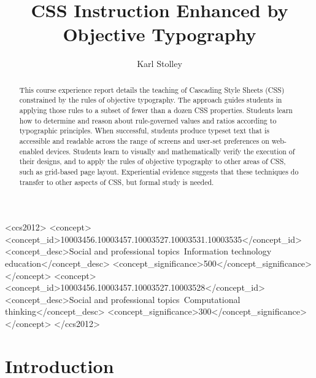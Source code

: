 \documentclass[sigplan,screen]{acmart}
\begin{document}
\title[Objective Typography]{CSS Instruction Enhanced by Objective Typography}

\author{Karl Stolley}

\begin{abstract}
This course experience report details the teaching of Cascading Style Sheets (CSS) constrained by the rules of objective typography. The approach guides students in applying those rules to a subset of fewer than a dozen CSS properties. Students learn how to determine and reason about rule-governed values and ratios according to typographic principles. When successful, students produce typeset text that is accessible and readable across the range of screens and user-set preferences on web-enabled devices. Students learn to visually and mathematically verify the execution of their designs, and to apply the rules of objective typography to other areas of CSS, such as grid-based page layout. Experiential evidence suggests that these techniques do transfer to other aspects of CSS, but formal study is needed.
\end{abstract}

\begin{CCSXML}
<ccs2012>
<concept>
  <concept_id>10003456.10003457.10003527.10003531.10003535</concept_id>
  <concept_desc>Social and professional topics~Information technology education</concept_desc>
  <concept_significance>500</concept_significance>
</concept>
<concept>
  <concept_id>10003456.10003457.10003527.10003528</concept_id>
  <concept_desc>Social and professional topics~Computational thinking</concept_desc>
  <concept_significance>300</concept_significance>
</concept>
</ccs2012>
\end{CCSXML}




\maketitle

\section{Introduction}
\end{document}
